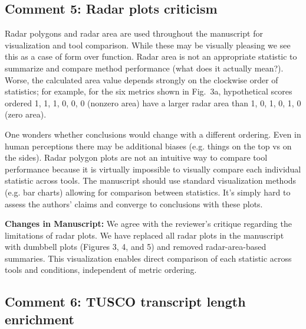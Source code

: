 \documentclass[11pt]{article}
\begin{document}
\subsection{Comment 5: Radar plots criticism}

\begin{reviewercomment}
Radar polygons and radar area are used throughout the manuscript for visualization and tool comparison. While these may be visually pleasing we see this as a case of form over function. Radar area is not an appropriate statistic to summarize and compare method performance (what does it actually mean?). Worse, the calculated area value depends strongly on the clockwise order of statistics; for example, for the six metrics shown in Fig.~3a, hypothetical scores ordered 1, 1, 1, 0, 0, 0 (nonzero area) have a larger radar area than 1, 0, 1, 0, 1, 0 (zero area).

\vspace{0.2cm}
One wonders whether conclusions would change with a different ordering. Even in human perceptions there may be additional biases (e.g. things on the top vs on the sides). Radar polygon plots are not an intuitive way to compare tool performance because it is virtually impossible to visually compare each individual statistic across tools. The manuscript should use standard visualization methods (e.g. bar charts) allowing for comparison between statistics. It's simply hard to assess the authors' claims and converge to conclusions with these plots.
\end{reviewercomment}

\begin{responseboxnew}
\textbf{Changes in Manuscript:} We agree with the reviewer's critique regarding the limitations of radar plots. We have replaced all radar plots in the manuscript with dumbbell plots (Figures 3, 4, and 5) and removed radar-area-based summaries. This visualization enables direct comparison of each statistic across tools and conditions, independent of metric ordering.
\end{responseboxnew}

\subsection{Comment 6: TUSCO transcript length enrichment}
\end{document}
